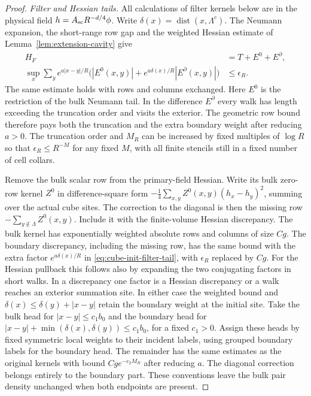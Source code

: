 \documentclass[11pt]{article}
\theoremstyle{definition}
\newcommand{\dist}{\operatorname{dist}}
\begin{document}
\begin{proof}
\emph{Filter and Hessian tails.}
All calculations of filter kernels below are in the physical field
\(h=A_{\rm sc}R^{-d/4}\phi\). Write \(\delta(x)=\dist(x,\Lambda^c)\).
The Neumann expansion, the short-range row gap and the weighted
Hessian estimate of Lemma~\ref{lem:extension-cavity} give
\begin{align}
 H_F&=T+E^0+E^\partial, \\
 \sup_x\sum_y e^{a|x-y|/R}
 \bigl(|E^0(x,y)|+e^{a\delta(x)/R}|E^\partial(x,y)|\bigr)
 &\le \epsilon_R . \label{eq:cube-init-filter-tail}
\end{align}
The same estimate holds with rows and columns exchanged. Here
\(E^0\) is the restriction of the bulk Neumann tail. In the
difference \(E^\partial\) every walk has length exceeding the
truncation order and visits the exterior. The geometric row bound
therefore pays both the truncation and the extra boundary weight
after reducing \(a>0\). The truncation order and \(M_R\) can be
increased by fixed multiples of \(\log R\) so that
\(\epsilon_R\le R^{-M}\) for any fixed \(M\), with all finite
stencils still in a fixed number of cell collars.

Remove the bulk scalar row from the primary-field Hessian.
Write its bulk zero-row kernel \(Z^0\) in difference-square form
\(-\frac14\sum_{x,y} Z^0(x,y)(h_x-h_y)^2\), summing over the
actual cube sites. The correction to the diagonal is then the
missing row \(-\sum_{y\notin\Lambda} Z^0(x,y)\). Include it with
the finite-volume Hessian discrepancy. The bulk kernel has
exponentially weighted absolute rows and columns of size \(C g\).
The boundary discrepancy, including the missing row, has the
same bound with the extra factor \(e^{a\delta(x)/R}\) in
\eqref{eq:cube-init-filter-tail}, with \(\epsilon_R\) replaced by
\(C g\). For the Hessian pullback this follows also by expanding
the two conjugating factors in short walks. In a discrepancy one
factor is a Hessian discrepancy or a walk reaches an exterior
summation site. In either case the weighted bound and
\(\delta(x)\le\delta(y)+|x-y|\) retain the boundary weight at
the initial site. Take the bulk head for \(|x-y|\le c_1 b_0\)
and the boundary head for
\(|x-y|+\min(\delta(x),\delta(y))\le c_1 b_0\), for a fixed
\(c_1>0\). Assign these heads by fixed symmetric local weights
to their incident labels, using grouped boundary labels for the
boundary head. The remainder has the same estimates as the
original kernels with bound \(C g e^{-c_2 M_R}\) after reducing
\(a\). The diagonal correction belongs entirely to the boundary
part. These conventions leave the bulk pair density unchanged
when both endpoints are present.


\end{proof}
\end{document}
